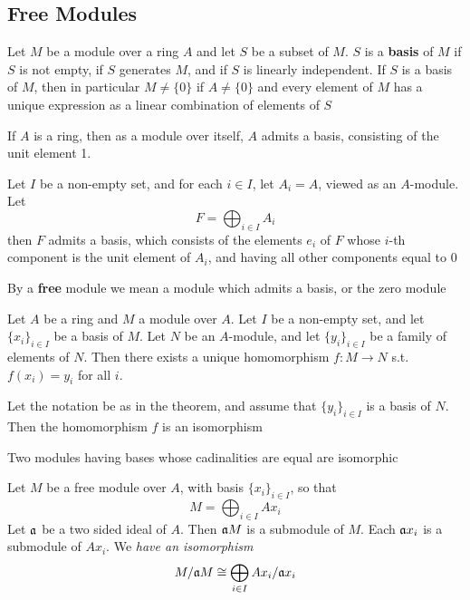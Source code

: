 \documentclass[11pt]{article}
\begin{document}
\subsection{Free Modules}
\label{sec:org9936416}
Let \(M\) be a module over a ring \(A\) and let \(S\) be a subset of \(M\). \(S\) is a \textbf{basis}
of \(M\) if \(S\) is not empty, if \(S\) generates \(M\), and if \(S\) is linearly independent.
If \(S\) is a basis of \(M\), then in particular \(M\neq\{0\}\) if \(A\neq\{0\}\) and every element
of \(M\) has a unique expression as a linear combination of elements of \(S\)

If \(A\) is a ring, then as a module over itself, \(A\) admits a basis, consisting of the unit
element 1.

Let \(I\) be a non-empty set, and for each \(i\in I\), let \(A_i=A\), viewed as an \(A\)-module. Let
\begin{equation*}
F=\bigoplus_{i\in I}A_i
\end{equation*}
then \(F\) admits a basis, which consists of the elements \(e_i\) of \(F\) whose \(i\)-th
component is the unit element of \(A_i\), and having all other components equal to 0

By a \textbf{free} module we mean a module which admits a basis, or the zero module

\begin{theorem}[]
Let \(A\) be a ring and \(M\) a module over \(A\). Let \(I\) be a non-empty set, and
let \(\{x_i\}_{i\in I}\) be a basis of \(M\). Let \(N\) be an \(A\)-module, and let \(\{y_i\}_{i\in I}\) be
a family of elements of \(N\). Then there exists a unique homomorphism \(f:M\to N\)
s.t. \(f(x_i)=y_i\) for all \(i\).
\end{theorem}

\begin{corollary}[]
Let the notation be as in the theorem, and assume that \(\{y_i\}_{i\in I}\) is a basis of \(N\). Then
the homomorphism \(f\) is an isomorphism
\end{corollary}

\begin{corollary}[]
Two modules having bases whose cadinalities are equal are isomorphic
\end{corollary}

Let \(M\) be a free module over \(A\), with basis \(\{x_i\}_{i\in I}\), so that
\begin{equation*}
M=\bigoplus_{i\in I}Ax_i
\end{equation*}
Let \(\mathfrak{a}\) be a two sided ideal of \(A\). Then \(\mathfrak{a} M\) is a submodule of \(M\). Each \(\mathfrak{a} x_i\) is a
submodule of \(Ax_i\). We \emph{have an isomorphism}
   \begin{equation*}
M/\mathfrak{a} M\cong\bigoplus_{i\in I}Ax_i/\mathfrak{a} x_i
   \end{equation*}
\end{document}
